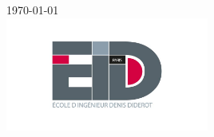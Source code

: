 \documentclass[11pt]{article}
\begin{document}
\begin{titlepage}
{\large \today}\\[0.1cm] %


\includegraphics[width=0.5\textwidth]{figures/eidd.jpeg}\\[0cm] %
 

\vfill %

\end{titlepage}

\tableofcontents







\end{document}

